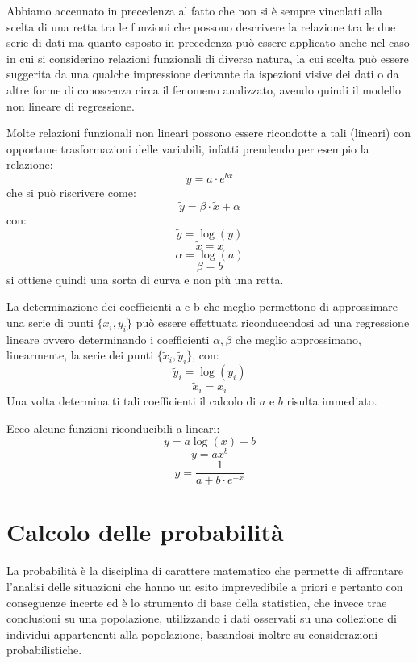 \documentclass[a4paper,12pt, oneside]{book}
\begin{document}
Abbiamo accennato in precedenza al fatto che non si è sempre vincolati alla scelta di una retta tra le funzioni
che possono descrivere la relazione tra le due serie di dati ma quanto esposto in precedenza può essere applicato 
anche nel caso in cui si considerino relazioni funzionali di diversa natura, la cui scelta può essere suggerita
da una qualche impressione derivante da ispezioni visive dei dati o da altre forme di conoscenza circa il fenomeno analizzato,
avendo quindi il modello non lineare di regressione.

Molte relazioni funzionali non lineari possono essere ricondotte a tali (lineari) con opportune trasformazioni delle variabili,
infatti prendendo per esempio la relazione:
\[ y = a\cdot e^{bx} \]
che si può riscrivere come:
\[ \widetilde{y} = \beta\cdot \widetilde{x}+\alpha \]
con: 
\[ \widetilde{y}=\log(y) \]
\[ \widetilde{x}=x \]
\[ \alpha=\log(a) \]
\[ \beta = b \]
si ottiene quindi una sorta di curva e non più una retta.

La determinazione dei coefficienti a e b che meglio permettono di approssimare una serie di punti $\{x_i,y_i\}$ 
può essere effettuata riconducendosi ad una regressione lineare ovvero determinando i coefficienti $\alpha,\beta$ 
che meglio approssimano, linearmente, la serie dei punti $\{\widetilde{x}_i,\widetilde{y}_i\}$, con:
\[ \widetilde{y}_i = \log(y_i) \]
\[ \widetilde{x}_i = x_i \]
Una volta determina ti tali coefficienti il calcolo di $a$ e $b$ risulta immediato. 

Ecco alcune funzioni riconducibili a lineari:
\[ y = a \log(x) + b \]
\[ y=ax^b \]
\[ y=\frac{1}{a+b\cdot e^{-x}} \]

\chapter{Calcolo delle probabilità}
La probabilità è la disciplina di carattere matematico che permette di affrontare l'analisi 
delle situazioni che hanno un esito imprevedibile a priori e pertanto con conseguenze incerte 
ed è lo strumento di base della statistica, che invece trae conclusioni
su una popolazione, utilizzando i dati osservati su una collezione di individui appartenenti alla popolazione,
basandosi inoltre su considerazioni probabilistiche.
\end{document}
